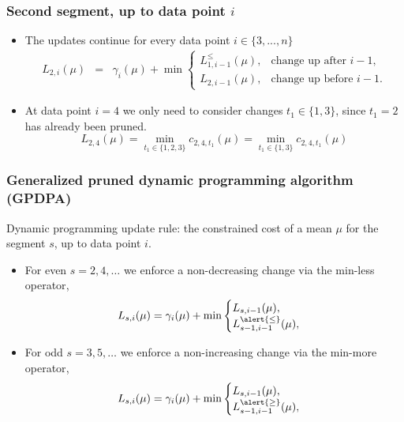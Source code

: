 \documentclass{beamer}
\begin{document}
\begin{frame}
  \frametitle{Second segment, up to data point $i$}
  \begin{itemize} 
  \item The updates continue for every data point $i\in\{3, ..., n\}$
    \begin{eqnarray*}
      L_{2,i}(\mu) &=&  \gamma_i(\mu) + \min
      \begin{cases}
        L_{1,i-1}^{\leq}(\mu), & \text{change up after $i-1$,}\\
        L_{2,i-1}(\mu), & \text{change up before $i-1$.}
      \end{cases}  
    \end{eqnarray*}
  \item At data point $i=4$ we only need to consider changes $t_1\in\{1,3\}$, since $t_1=2$ has already been pruned. 
$$
L_{2,4}(\mu) = \min_{t_1\in\{1,2,3\}} c_{2,4,t_1}(\mu) =  
\min_{t_1\in\{1,3\}} c_{2,4,t_1}(\mu)
$$
      
  \end{itemize}
\end{frame}


\begin{frame}
  \frametitle{Generalized pruned dynamic programming algorithm (GPDPA)}
  Dynamic programming update rule: the constrained cost of a
  mean $\mu$ for the segment $s$, up to data point $i$.
  \begin{itemize}
  \item For even $s=2, 4, \dots$ we enforce a non-decreasing change via the \alert{min-less operator},
    \begin{equation*}
      L_{s,i}(\mu) = \gamma_i(\mu) + \min
      \begin{cases}
        L_{s,i-1}(\mu),\\
        L_{s-1,i-1}^{\alert{\leq}}(\mu),
      \end{cases}
    \end{equation*}
  \item For odd $s=3, 5, \dots$ we enforce a non-increasing change via the
    \alert{min-more operator},
    \begin{equation*}
      L_{s,i}(\mu) = \gamma_i(\mu) + \min
      \begin{cases}
        L_{s,i-1}(\mu),\\
        L_{s-1,i-1}^{\alert{\geq}}(\mu),
      \end{cases}
    \end{equation*}
  \end{itemize}
\end{frame}
\end{document}
